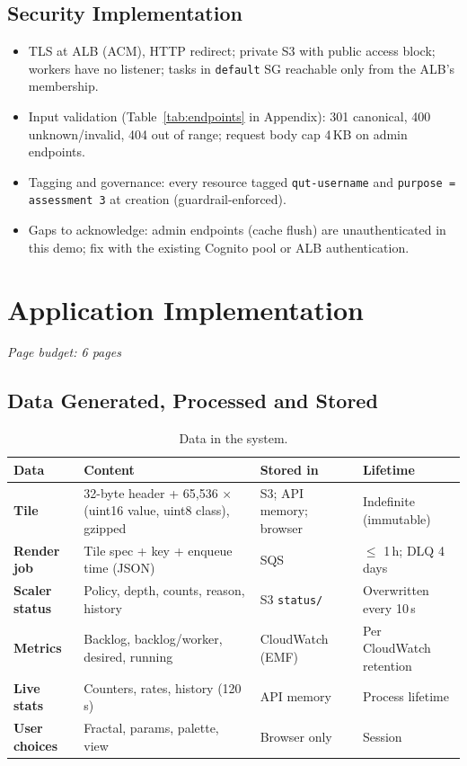 \documentclass[a4paper,12pt]{article}
\newcommand{\budget}[1]{\hfill{\small\textcolor{mutedText}{\emph{Page budget: #1}}}\par}
\begin{document}
\subsection{Security Implementation}

\begin{yourwriting}
\begin{itemize}
    \item TLS at ALB (ACM), HTTP redirect; private S3 with public access block; workers have no listener; tasks in \texttt{default} SG reachable only from the ALB's membership.
    \item Input validation (Table~\ref{tab:endpoints} in Appendix): 301 canonical, 400 unknown/invalid, 404 out of range; request body cap 4\,KB on admin endpoints.
    \item Tagging and governance: every resource tagged \texttt{qut-username} and \texttt{purpose = assessment 3} at creation (guardrail-enforced).
    \item Gaps to acknowledge: admin endpoints (cache flush) are unauthenticated in this demo; fix with the existing Cognito pool or ALB authentication.
\end{itemize}
\end{yourwriting}

\newpage
\section{Application Implementation}
\label{sec:app}
\budget{6 pages}

\subsection{Data Generated, Processed and Stored}

\begin{table}[H]
\centering
\small
\begin{tabularx}{\linewidth}{>{\bfseries}p{2.8cm} X p{2.6cm} p{2.6cm}}
\toprule
Data & Content & Stored in & Lifetime \\
\midrule
Tile & 32-byte header + 65,536 $\times$ (uint16 value, uint8 class), gzipped & S3; API memory; browser & Indefinite (immutable) \\
Render job & Tile spec + key + enqueue time (JSON) & SQS & $\leq$ 1\,h; DLQ 4 days \\
Scaler status & Policy, depth, counts, reason, history & S3 \texttt{status/} & Overwritten every 10\,s \\
Metrics & Backlog, backlog/worker, desired, running & CloudWatch (EMF) & Per CloudWatch retention \\
Live stats & Counters, rates, history (120\,s) & API memory & Process lifetime \\
User choices & Fractal, params, palette, view & Browser only & Session \\
\bottomrule
\end{tabularx}
\caption{Data in the system.}
\label{tab:data}
\end{table}
\end{document}
